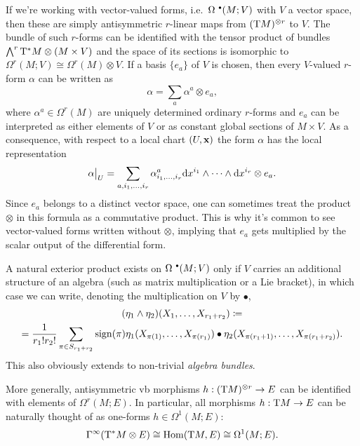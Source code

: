 \begin{example}
    If we're working with vector-valued forms, i.e.~$\Omega^{\smbullet }(M;V)$ with $V$ a vector space, then these are simply antisymmetric $r$-linear maps from $(\T M)^{\otimes r}$ to $V$. The bundle of such $r$-forms can be identified with the tensor product of bundles $\bigwedge^r \T^\ast M\otimes (M\times V)$ and the space of its sections is isomorphic to $\Omega^r(M;V)\cong \Omega^r(M)\otimes V$. If a basis $\{e_a\}$ of $V$ is chosen, then every $V$-valued $r$-form $\alpha$ can be written as
    \[\alpha=\sum_a \alpha^a\otimes e_a,\]
    where $\alpha^a\in \Omega^r(M)$ are uniquely determined ordinary $r$-forms and $e_a$ can be interpreted as either elements of $V$ or as constant global sections of $M\times V$. As a consequence, with respect to a local chart $(U,\bf{x})$ the form $\alpha$ has the local representation
    \[\restr{\alpha}{U}=\sum_{a,i_1,\ldots,i_r}\alpha^a_{i_1,\ldots,i_r}\dd x^{i_1}\wedge\cdots\wedge\dd x^{i_r}\otimes e_a.\]
    Since $e_a$ belongs to a distinct vector space, one can sometimes treat the product $\otimes$ in this formula as a commutative product. This is why it's common to see vector-valued forms written without $\otimes$, implying that $e_a$ gets multiplied by the scalar output of the differential form.

    A natural exterior product exists on $\Omega^{\smbullet }(M;V)$ only if $V$ carries an additional structure of an algebra (such as matrix multiplication or a Lie bracket), in which case we can write, denoting the multiplication on $V$ by $\bullet$,
    \begin{multline}
        (\eta_1\wedge\eta_2)(X_1,\ldots,X_{r_1+r_2})\coloneqq \\
        =\frac{1}{r_1!r_2!}\sum_{\pi\in S_{r_1+r_2}}\sign(\pi)\eta_1(X_{\pi(1)},\ldots,X_{\pi(r_1)})\bullet \eta_2(X_{\pi(r_1+1)},\ldots,X_{\pi(r_1+r_2)}).\label{eq 2.4.17 RS1}
    \end{multline}
    This also obviously extends to non-trivial \emph{algebra bundles}.
\end{example}

\begin{example}
    More generally, antisymmetric \gls{vb} morphisms $h:(\T M)^{\otimes r}\to E$ can be identified with elements of $\Omega^r(M;E)$. In particular, all morphisms $h:\T M\to E$ can be naturally thought of as one-forms $h\in\Omega^1(M;E)$:
    \[\Gamma^\infty(\T^\ast M\otimes E)\cong \Hom(\T M,E)\cong \Omega^1(M;E).\]
\end{example}


